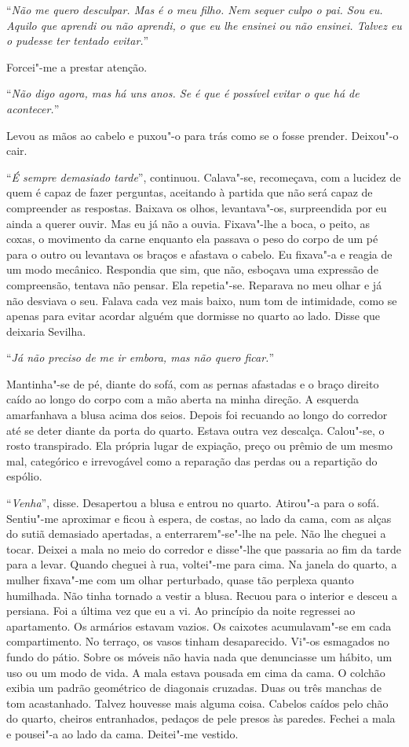 ``\emph{Não me quero desculpar. Mas é o meu filho. Nem sequer culpo o
pai. Sou eu. Aquilo que aprendi ou não aprendi, o que eu lhe ensinei ou
não ensinei. Talvez eu o pudesse ter tentado evitar.}''

Forcei"-me a prestar atenção.

``\emph{Não digo agora, mas há uns anos. Se é que é possível evitar o que
há de acontecer.}''

Levou as mãos ao cabelo e puxou"-o para trás como se o fosse prender.
Deixou"-o cair.

``\emph{É sempre demasiado tarde}'',
continuou. Calava"-se, recomeçava, com a lucidez de quem é capaz de
fazer perguntas, aceitando à partida que não será capaz de compreender
as respostas. Baixava os olhos, levantava"-os, surpreendida por eu ainda
a querer ouvir. Mas eu já não a ouvia. Fixava"-lhe a boca, o peito, as
coxas, o movimento da carne enquanto ela passava o peso do corpo de um
pé para o outro ou levantava os braços e afastava o cabelo. Eu fixava"-a
e reagia de um modo mecânico. Respondia que sim, que não, esboçava uma
expressão de compreensão, tentava não pensar. Ela repetia"-se. Reparava
no meu olhar e já não desviava o seu. Falava cada vez mais baixo, num
tom de intimidade, como se apenas para evitar acordar alguém que
dormisse no quarto ao lado. Disse que deixaria Sevilha.

``\emph{Já não preciso de me ir embora, mas não quero ficar.}''

Mantinha"-se de pé, diante do sofá, com as pernas afastadas e o braço
direito caído ao longo do corpo com a mão aberta na minha direção. A
esquerda amarfanhava a blusa acima dos seios. Depois foi recuando ao
longo do corredor até se deter diante da porta do quarto. Estava outra
vez descalça. Calou"-se, o rosto transpirado. Ela própria lugar de
expiação, preço ou prêmio de um mesmo mal, categórico e irrevogável como
a reparação das perdas ou a repartição do espólio.

``\emph{Venha}'',
disse. Desapertou a blusa e entrou no quarto. Atirou"-a para o sofá.
Sentiu"-me aproximar e ficou à espera, de costas, ao lado da cama, com
as alças do sutiã demasiado apertadas, a enterrarem"-se"-lhe na pele.
Não lhe cheguei a tocar. Deixei a mala no meio do corredor e disse"-lhe
que passaria ao fim da tarde para a levar. Quando cheguei à rua,
voltei"-me para cima. Na janela do quarto, a mulher fixava"-me com um
olhar perturbado, quase tão perplexa quanto humilhada. Não tinha tornado
a vestir a blusa. Recuou para o interior e desceu a persiana. Foi a última
vez que eu a vi. Ao princípio da noite regressei ao apartamento. Os
armários estavam vazios. Os caixotes acumulavam"-se em cada
compartimento. No terraço, os vasos tinham desaparecido. Vi"-os
esmagados no fundo do pátio. Sobre os móveis não havia nada que
denunciasse um hábito, um uso ou um modo de vida.
A mala estava pousada em cima da cama. O colchão exibia um padrão
geométrico de diagonais cruzadas. Duas ou três manchas de tom
acastanhado. Talvez houvesse mais alguma coisa. Cabelos caídos pelo chão
do quarto, cheiros entranhados, pedaços de pele presos às paredes.
Fechei a mala e pousei"-a ao lado da cama. Deitei"-me vestido.

